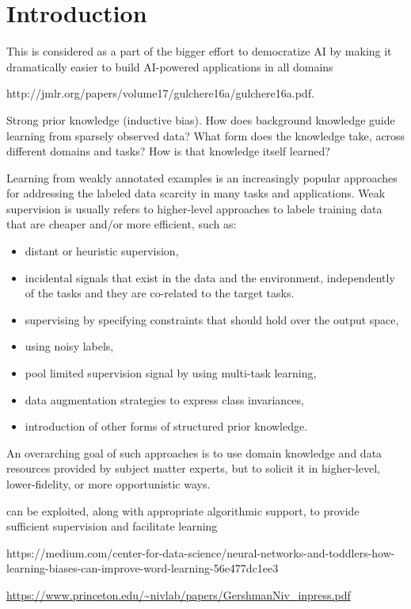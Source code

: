 \chapter{Introduction}


This is considered as a part of the bigger effort to democratize AI by making it dramatically easier to build AI-powered applications in all domains



http://jmlr.org/papers/volume17/gulchere16a/gulchere16a.pdf.

Strong prior knowledge (inductive bias).
How does background knowledge guide learning from sparsely observed data? 
What form does the knowledge take, across different domains and tasks?
How is that knowledge itself learned? 


Learning from weakly annotated examples is an increasingly popular approaches for addressing the labeled data scarcity in many tasks and applications. 
Weak supervision is usually refers to higher-level approaches to labele training data that are cheaper and/or more efficient, such as:
\begin{itemize}
    \item distant or heuristic supervision,
    \item incidental signals that  exist in the data and the environment, independently of the tasks and they are co-related to the target tasks.
    \item supervising by specifying constraints that should hold over the output space,
    \item using noisy labels, 
    \item pool limited supervision signal by using multi-task learning,
    \item data augmentation strategies to express class invariances,
    \item introduction of other forms of structured prior knowledge.
\end{itemize}
An overarching goal of such approaches is to use domain knowledge and data resources provided by subject matter experts, but to solicit it in higher-level, lower-fidelity, or more opportunistic ways.

can be exploited, along with appropriate algorithmic support, to provide sufficient supervision and facilitate learning


https://medium.com/center-for-data-science/neural-networks-and-toddlers-how-learning-biases-can-improve-word-learning-56e477dc1ee3


\url{https://www.princeton.edu/~nivlab/papers/GershmanNiv_inpress.pdf}


